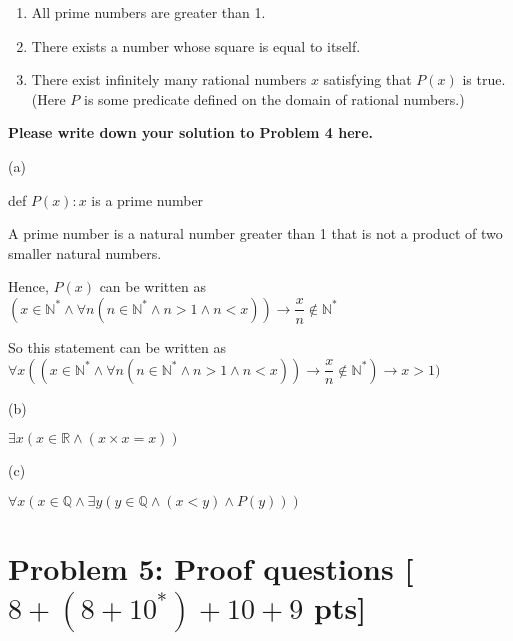 \documentclass[11pt,twoside]{article}
\newcommand{\problem}[1]{\section*{Problem #1}}
\newenvironment{solution}{{\par\noindent\it Solution.}}{}
\begin{document}
\begin{enumerate}
    \item All prime numbers are greater than 1.
    \item There exists a number whose square is equal to itself.
    \item[(c$^\star$)] There exist infinitely many rational numbers $x$ satisfying that $P(x)$ is true. \\
    (Here $P$ is some predicate defined on the domain of rational numbers.)
\end{enumerate}

\begin{solution}
\textbf{Please write down your solution to Problem 4 here.}

\hspace*{\fill}

(a)

def $P(x): x$ is a prime number

A prime number is a natural number greater than 1 that is not a product of two smaller natural numbers.

Hence, $P(x)$ can be written as $(x \in {\mathbb{N}^*} \land \forall n (n \in {\mathbb{N}^*} \land n > 1 \land n < x)) \rightarrow \dfrac{x}{n} \notin {\mathbb{N}^*} $

So this statement can be written as $\forall x ((x \in {\mathbb{N}^*} \land \forall n (n \in {\mathbb{N}^*} \land n > 1 \land n < x)) \rightarrow \dfrac{x}{n} \notin {\mathbb{N}^*})\rightarrow x>1) $




\hspace*{\fill}

(b)

$ \exists x(x \in {\mathbb{R}} \land (x \times x = x)) $

\hspace*{\fill}


(c)

$\forall x(x \in {\mathbb{Q}} \land \exists y(y \in {\mathbb{Q}}\land (x<y) \land P(y)))$





\end{solution}

\problem{5: Proof questions [$8+(8+10^*)+10+9$ pts]}
\end{document}
